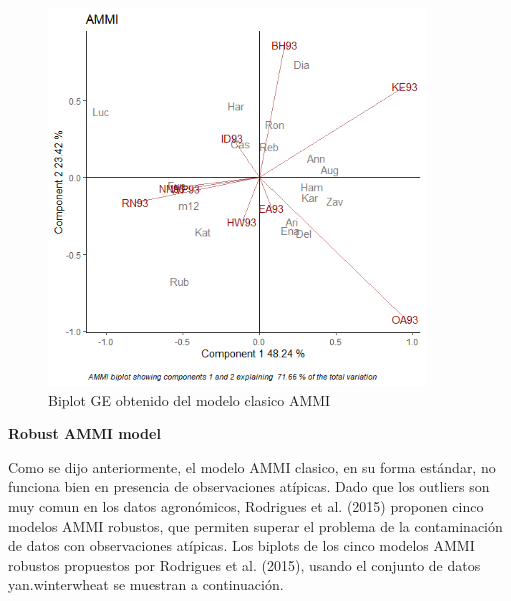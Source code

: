 \begin{figure}[H]
	\begin{center}
		\includegraphics[width=10cm]{./Graficos/AMMI.png}
	\end{center}
	\caption{Biplot GE obtenido del modelo clasico AMMI}
\end{figure}

\textbf{Robust AMMI model}

Como se dijo anteriormente, el modelo AMMI clasico, en su forma estándar, no funciona bien en presencia de observaciones atípicas. Dado que los outliers son muy comun en los datos agronómicos, Rodrigues et al. (2015) proponen cinco modelos AMMI robustos, que permiten superar el problema de la contaminación de datos con observaciones atípicas. Los biplots de los cinco modelos AMMI robustos propuestos por Rodrigues et al. (2015), usando el conjunto de datos yan.winterwheat se muestran a continuación.

